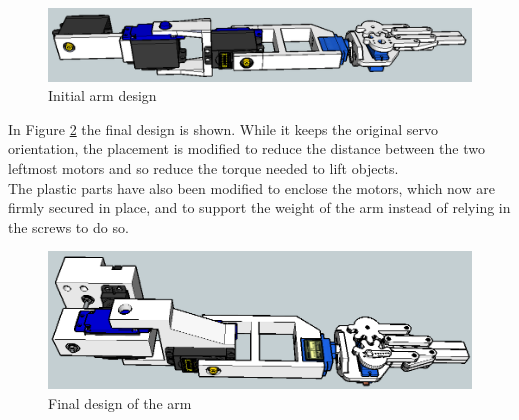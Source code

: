 	\begin{figure}[H]
			\centering
			\includegraphics[scale=0.4]{images/Diagrams/firstArm}
			\caption{Initial arm design}  
			\label{firstArm}
	\end{figure}
	\bigskip

In Figure \ref{finalArm} the final design is shown. While it keeps the original servo orientation, the placement is modified to reduce the distance between the two leftmost motors and so reduce the torque needed to lift objects. \\
The plastic parts have also been modified to enclose the motors, which now are firmly secured in place, and to support the weight of the arm instead of relying in the screws to do so.

	\begin{figure}[H]
			\centering
			\includegraphics[scale=0.4]{images/Diagrams/finalArm}
			\caption{Final design of the arm}
			\label{finalArm}
	\end{figure}
	\bigskip


